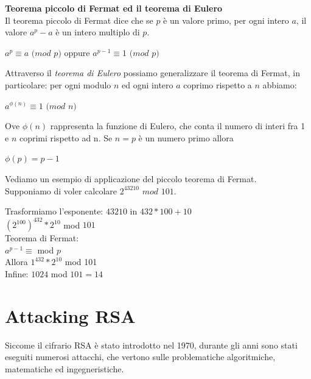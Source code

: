 \documentclass[11pt, oneside]{article}   	%
\begin{document}
\textbf{Teorema piccolo di Fermat ed il teorema di Eulero}\\
Il teorema piccolo di Fermat dice che se $p$ è un valore primo, per ogni intero $a$, il valore $a^p-a$ è un intero multiplo di $p$.
\begin{center}
$a^p \equiv a$ $(mod$ $p )$  oppure  $a^{p-1}\equiv 1$ $(mod$ $p )$
\end{center}
Attraverso il \emph{teorema di Eulero} possiamo generalizzare il teorema di Fermat, in particolare: per ogni modulo $n$ ed ogni intero $a$ coprimo rispetto a $n$ abbiamo:
\begin{center}
$a^{\phi(n)} \equiv 1$ $(mod$ $n)$
\end{center}
Ove $\phi(n)$ rappresenta la funzione di Eulero, che conta il numero di interi fra 1 e $n$ coprimi rispetto ad n. Se $n = p$ è un numero primo allora 
\begin{center}
$\phi(p) = p-1$
\end{center}
Vediamo un esempio di applicazione del piccolo teorema di Fermat.\\
Supponiamo di voler calcolare $2^{43210}$ $mod$ $101$.
\begin{center}
Trasformiamo l'esponente: $43210$ in  $432*100 + 10$\\
$(2^{100})^{432}  * 2^{10}$ mod $101$\\ 
Teorema di Fermat: \\$a^{p-1}\equiv$ mod $p$\\
Allora $1^{432} * 2^{10} $ mod 101\\
Infine: $1024$ mod $101 = 14$
\end{center}
\section*{Attacking RSA}
Siccome il cifrario RSA è stato introdotto nel 1970, durante gli anni sono stati eseguiti numerosi attacchi, che vertono sulle problematiche algoritmiche, matematiche ed ingegneristiche. 
\end{document}
